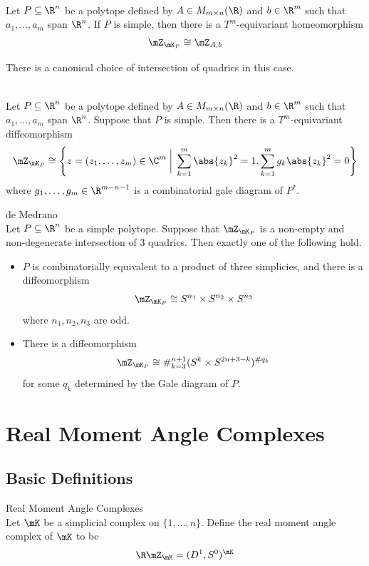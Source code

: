 \documentclass[a4paper]{article}
\begin{document}
\begin{prp}{}{}\\
Let $P\subseteq\R^n$ be a polytope defined by $A\in M_{m\times n}(\R)$ and $b\in\R^m$ such that $a_1,\dots,a_m$ span $\R^n$. If $P$ is simple, then there is a $T^m$-equivariant homeomorphism $$\mZ_{\mK_P}\cong\mZ_{A,b}$$
\end{prp}

There is a canonical choice of intersection of quadrics in this case. 

\begin{prp}{}{}\\
Let $P\subseteq\R^n$ be a polytope defined by $A\in M_{m\times n}(\R)$ and $b\in\R^m$ such that $a_1,\dots,a_m$ span $\R^n$. Suppose that $P$ is simple. Then there is a $T^m$-equivariant diffeomorphism $$\mZ_{\mK_P}\cong\left \{z=(z_1,\dots,z_m)\in\C^m\;\bigg{|}\;\sum_{k=1}^m\abs{z_k}^2=1,\sum_{k=1}^mg_k\abs{z_k}^2=0\right\}$$ where $g_1,\dots,g_m\in\R^{m-n-1}$ is a combinatorial gale diagram of $P^\ast$. 
\end{prp}

\begin{thm}{de Medrano}{}\\
Let $P\subseteq\R^n$ be a simple polytope. Suppose that $\mZ_{\mK_P}$ is a non-empty and non-degenerate intersection of $3$ quadrics. Then exactly one of the following hold. 
\begin{itemize}
\item $P$ is combinatorially equivalent to a product of three simplicies, and there is a diffeomorphism $$\mZ_{\mK_P}\cong S^{n_1}\times S^{n_2}\times S^{n_3}$$ where $n_1,n_2,n_3$ are odd. 
\item There is a diffeomorphism $$\mZ_{\mK_P}\cong\#_{k=3}^{n+1}(S^k\times S^{2n+3-k})^{\# q_k}$$ for some $q_k$ determined by the Gale diagram of $P$. 
\end{itemize}
\end{thm}

\pagebreak
\section{Real Moment Angle Complexes}
\subsection{Basic Definitions}
\begin{defn}{Real Moment Angle Complexes}{}\\
Let $\mK$ be a simplicial complex on $\{1,\dots,n\}$. Define the real moment angle complex of $\mK$ to be $$\R\mZ_\mK=(D^1,S^0)^\mK$$
\end{defn}
\end{document}

